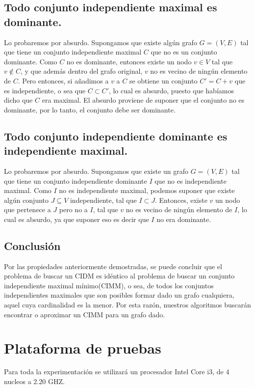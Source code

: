 \documentclass[a4paper]{article}
\begin{document}
\subsection{Todo conjunto independiente maximal es dominante.}
Lo probaremos por absurdo.  Supongamos que existe algún grafo $G = (V,E)$ tal que tiene un conjunto independiente maximal $C$ que no es un conjunto dominante. Como $C$ no es dominante, entonces existe un nodo $v \in V$ tal que $v \not \in C$, y que además dentro del grafo original, $v$ no es vecino de ningún elemento de $C$. Pero entonces, si añadimos a $v$ a $C$ se obtiene un conjunto $C' = {C + v}$ que es independiente, o sea que $C \subset C'$, lo cual es absurdo, puesto que habíamos dicho que $C$ era maximal. El absurdo proviene de suponer que el conjunto no es dominante, por lo tanto, el conjunto debe ser dominante.

\subsection{Todo conjunto independiente dominante es independiente maximal.}
Lo probaremos por absurdo.  Supongamos que existe un grafo $G = (V,E)$ tal que tiene un conjunto independiente dominante $I$ que no es independiente maximal. Como $I$ no es independiente maximal, podemos suponer que existe algún conjunto $J \subseteq V$ independiente, tal que $I \subset J$. Entonces, existe $v$ un nodo que pertenece a $J$ pero no a $I$, tal que $v$ no es vecino de ningún elemento de $I$, lo cual es absurdo, ya que suponer eso es decir que $I$ no era dominante. 

\subsection{Conclusión}
Por las propiedades anteriormente demostradas, se puede concluir que el problema de buscar un CIDM es idéntico al problema de buscar un conjunto independiente maximal mínimo(CIMM), o sea, de todos los conjuntos independientes maximales que son posibles formar dado un grafo cualquiera, aquel cuya cardinalidad es la menor. Por esta razón, nuestros algoritmos buscarán encontrar o aproximar un CIMM para un grafo dado.
\vspace*{0.6cm}
\section{Plataforma de pruebas}
\vspace*{0.3cm}
Para toda la experimentación se utilizará un procesador Intel Core i3, de 4 nucleos a 2.20 GHZ.
\end{document}
